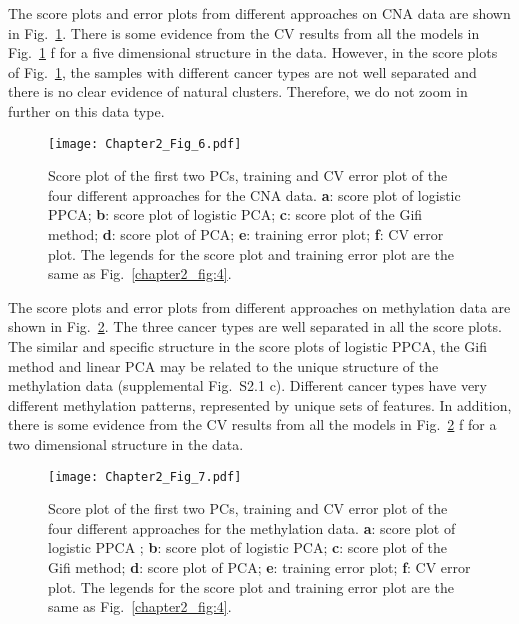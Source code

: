 The score plots and error plots from different approaches on CNA data are shown in Fig.~\ref{chapter2_fig:8}. There is some evidence from the CV results from all the models in Fig.~\ref{chapter2_fig:8} f for a five dimensional structure in the data. However, in the score plots of Fig.~\ref{chapter2_fig:8}, the samples with different cancer types are not well separated and there is no clear evidence of natural clusters. Therefore, we do not zoom in further on this data type.
\begin{figure}[htbp]
    \centering
    \texttt{[image: Chapter2\_Fig\_6.pdf]}
    \caption{Score plot of the first two PCs, training and CV error plot of the four different approaches for the CNA data. \textbf{a}: score plot of logistic PPCA; \textbf{b}: score plot of logistic PCA; \textbf{c}: score plot of the Gifi method; \textbf{d}: score plot of PCA; \textbf{e}: training error plot; \textbf{f}: CV error plot. The legends for the score plot and training error plot are the same as Fig.~\ref{chapter2_fig:4}.}
    \label{chapter2_fig:8}
\end{figure}

The score plots and error plots from different approaches on methylation data are shown in Fig.~\ref{chapter2_fig:9}. The three cancer types are well separated in all the score plots. The similar and specific structure in the score plots of logistic PPCA, the Gifi method and linear PCA may be related to the unique structure of the methylation data (supplemental Fig.~S2.1 c). Different cancer types have very different methylation patterns, represented by unique sets of features. In addition, there is some evidence from the CV results from all the models in Fig.~\ref{chapter2_fig:9} f for a two dimensional structure in the data.
\begin{figure}[htbp]
    \centering
    \texttt{[image: Chapter2\_Fig\_7.pdf]}
    \caption{Score plot of the first two PCs, training and CV error plot of the four different approaches for the methylation data. \textbf{a}: score plot of logistic PPCA ; \textbf{b}: score plot of logistic PCA; \textbf{c}: score plot of the Gifi method; \textbf{d}: score plot of PCA; \textbf{e}: training error plot; \textbf{f}: CV error plot. The legends for the score plot and training error plot are the same as Fig.~\ref{chapter2_fig:4}.}
    \label{chapter2_fig:9}
\end{figure}

